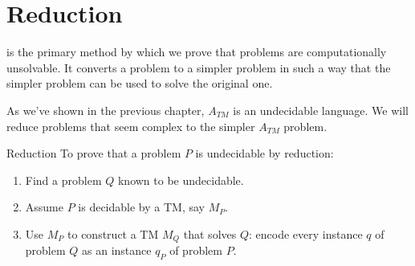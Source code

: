 \chapter{Reduction}
 is the primary method by which we prove that problems are computationally unsolvable. It converts a problem to a simpler problem in such a way that the simpler problem can be used to solve the original one.

As we've shown in the previous chapter, $A_{TM}$ is an undecidable language. We will reduce problems that seem complex to the simpler $A_{TM}$ problem.



\begin{tecbox}{Reduction}{}
    To prove that a problem $P$ is undecidable by reduction:
    \begin{enumerate}
        \item Find a problem $Q$ known to be undecidable.
        \item Assume $P$ is decidable by a TM, say $M_P$.
        \item Use $M_P$ to construct a TM $M_Q$ that solves $Q$: encode every instance $q$ of problem $Q$ as an instance $q_P$ of problem $P$.
    \end{enumerate}
\end{tecbox}
